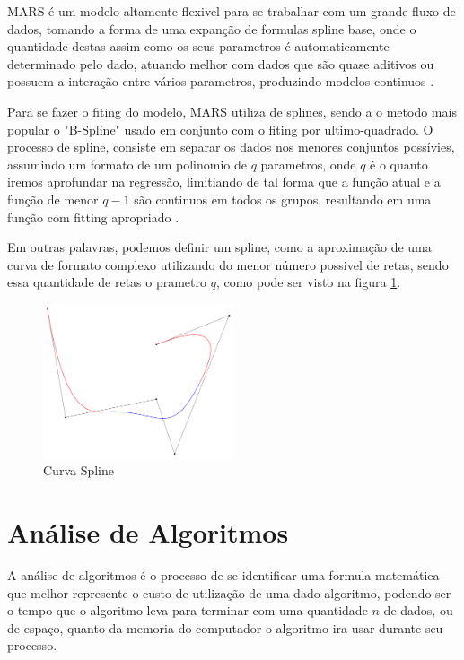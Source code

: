 \documentclass[
	12pt,				%
	openright,			%
	oneside,			%
	a4paper,			%
	english,			%
	brazil				%
	]{abntex2}
\begin{document}
MARS é um modelo altamente flexivel para se trabalhar com um grande fluxo de dados, tomando a forma de uma expanção
de formulas spline base, onde o quantidade destas assim como os seus parametros é automaticamente determinado
pelo dado, atuando melhor com dados que são quase aditivos ou possuem a interação entre vários parametros,
produzindo modelos continuos \cite{intro_mars}.

Para se fazer o fiting do modelo, MARS utiliza de splines, sendo a o metodo mais popular o "B-Spline" usado em
conjunto com o fiting por ultimo-quadrado. O processo de spline, consiste em separar os dados nos
menores conjuntos possívies, assumindo um formato de um polinomio de $q$ parametros, onde $q$ é o quanto iremos
aprofundar na regressão, limitiando de tal forma que a função atual e a função de menor $q-1$ são continuos em
todos os grupos, resultando em uma função com fitting apropriado \cite{intro_mars}. 

Em outras palavras, podemos definir um spline, como a aproximação de uma curva de formato complexo utilizando do 
menor número possivel de retas, sendo essa quantidade de retas o prametro $q$, como pode ser visto na figura \ref{Curva Spline}.

\begin{figure}[htb]
    \centering
    \caption{\label{Curva Spline}Curva Spline}
    \includegraphics[width=0.50\textwidth]{../Imgs/B-spline_curve.png}
\end{figure}


\section{Análise de Algoritmos}

A análise de algoritmos é o processo de se identificar uma formula matemática que melhor represente o custo de
utilização de uma dado algoritmo, podendo ser o tempo que o algoritmo leva para terminar com uma quantidade $n$
de dados, ou de espaço, quanto da memoria do computador o algoritmo ira usar durante seu processo.
\end{document}
